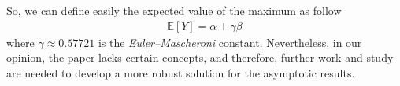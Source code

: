 


So, we can define easily the expected value of the maximum as follow
\begin{align*}
	\mathbb{E}[Y] = \alpha + \gamma \beta
\end{align*}
where $\gamma \approx 0.57721$ is the \textit{Euler–Mascheroni} constant. Nevertheless, in our opinion, the paper lacks certain concepts, and therefore, further work and study are needed to develop a more robust solution for the asymptotic results.
